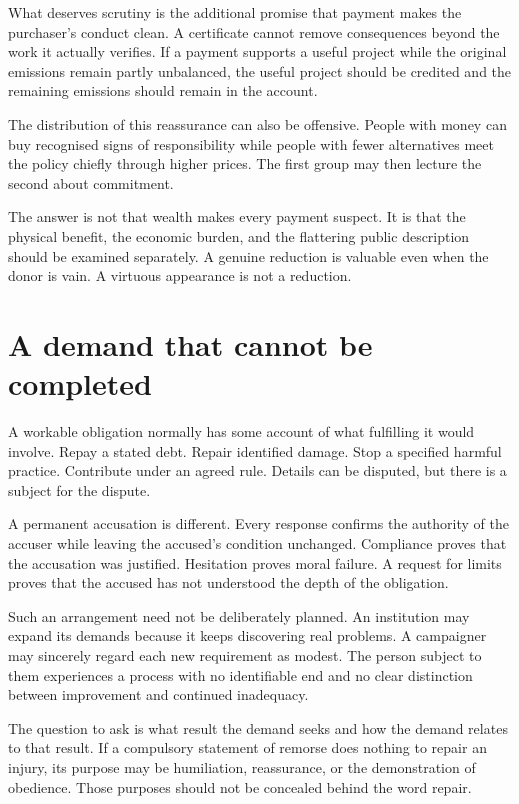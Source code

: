 \documentclass[12pt,a4paper]{book}
\begin{document}
What deserves scrutiny is the additional promise that payment makes the purchaser's conduct clean. A certificate cannot remove consequences beyond the work it actually verifies. If a payment supports a useful project while the original emissions remain partly unbalanced, the useful project should be credited and the remaining emissions should remain in the account.

The distribution of this reassurance can also be offensive. People with money can buy recognised signs of responsibility while people with fewer alternatives meet the policy chiefly through higher prices. The first group may then lecture the second about commitment.

The answer is not that wealth makes every payment suspect. It is that the physical benefit, the economic burden, and the flattering public description should be examined separately. A genuine reduction is valuable even when the donor is vain. A virtuous appearance is not a reduction.

\section*{A demand that cannot be completed}

A workable obligation normally has some account of what fulfilling it would involve. Repay a stated debt. Repair identified damage. Stop a specified harmful practice. Contribute under an agreed rule. Details can be disputed, but there is a subject for the dispute.

A permanent accusation is different. Every response confirms the authority of the accuser while leaving the accused's condition unchanged. Compliance proves that the accusation was justified. Hesitation proves moral failure. A request for limits proves that the accused has not understood the depth of the obligation.

Such an arrangement need not be deliberately planned. An institution may expand its demands because it keeps discovering real problems. A campaigner may sincerely regard each new requirement as modest. The person subject to them experiences a process with no identifiable end and no clear distinction between improvement and continued inadequacy.

The question to ask is what result the demand seeks and how the demand relates to that result. If a compulsory statement of remorse does nothing to repair an injury, its purpose may be humiliation, reassurance, or the demonstration of obedience. Those purposes should not be concealed behind the word repair.
\end{document}
